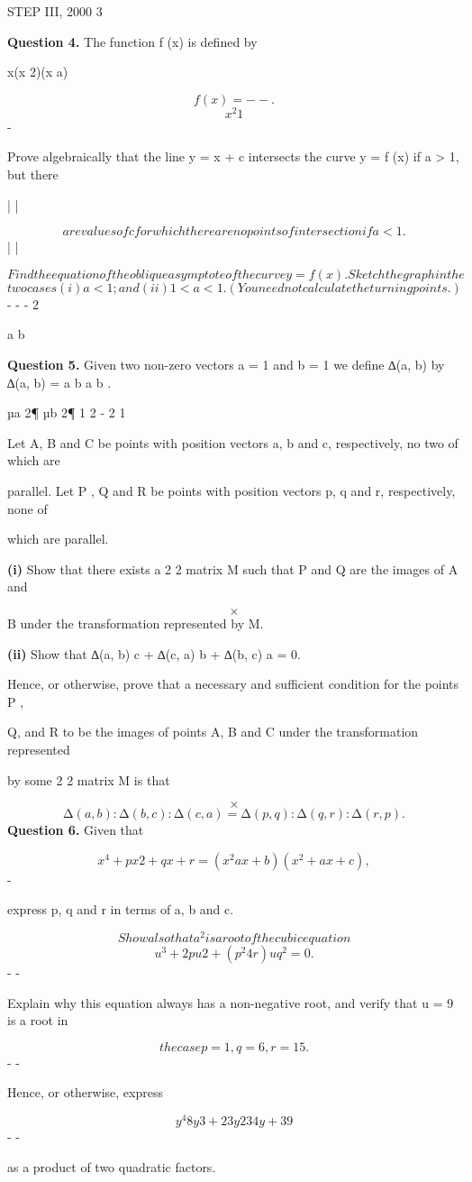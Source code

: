 \documentclass[12pt]{article}
\begin{document}
\begin{flushleft}
STEP III, 2000 3\par
\bigskip\textbf{Question 4.} The function f (x) is defined by\par
x(x 2)(x a)\par
\[f (x) = - - .\]
\[x^2 1\]
-\par
Prove algebraically that the line y = x + c intersects the curve y = f (x) if a > 1, but there\par
| |\par
\[are values of c for which there are no points of intersection if a < 1.\]
| |\par
\[Find the equation of the oblique asymptote of the curve y = f (x). Sketch the graph in the\]
\[two cases (i) a < 1 ; and (ii) 1 < a < 1 . (You need not calculate the turning points.)\]
- - - 2\par
a b\par
\bigskip\textbf{Question 5.} Given two non-zero vectors a = 1 and b = 1 we define ∆(a, b) by ∆(a, b) = a b a b .\par
µa 2¶ µb 2¶ 1 2 - 2 1\par
Let A, B and C be points with position vectors a, b and c, respectively, no two of which are\par
parallel. Let P , Q and R be points with position vectors p, q and r, respectively, none of\par
which are parallel.\par
\textbf{(i)} Show that there exists a 2 2 matrix M such that P and Q are the images of A and\par
\[\times\]
B under the transformation represented by M.\par
\textbf{(ii)} Show that ∆(a, b) c + ∆(c, a) b + ∆(b, c) a = 0.\par
Hence, or otherwise, prove that a necessary and sufficient condition for the points P ,\par
Q, and R to be the images of points A, B and C under the transformation represented\par
by some 2 2 matrix M is that\par
\[\times\]
\[∆(a, b) : ∆(b, c) : ∆(c, a) = ∆(p, q) : ∆(q, r) : ∆(r, p) .\]
\bigskip\textbf{Question 6.} Given that\par
\[x^4 + px2 + qx + r = (x^2 ax + b)(x^2 + ax + c),\]
-\par
express p, q and r in terms of a, b and c.\par
\[Show also that a^2 is a root of the cubic equation\]
\[u^3 + 2pu2 + (p^2 4r)u q^2 = 0.\]
- -\par
Explain why this equation always has a non-negative root, and verify that u = 9 is a root in\par
\[the case p = 1, q = 6, r = 15 .\]
- -\par
Hence, or otherwise, express\par
\[y^4 8y3 + 23y2 34y + 39\]
- -\par
as a product of two quadratic factors.\par
\end{flushleft}
\end{document}
